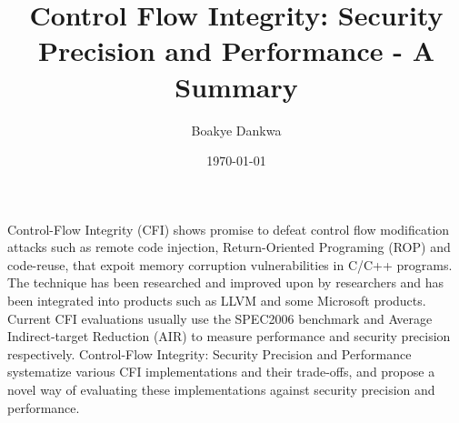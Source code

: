 \documentclass[dvips,12pt]{article}
\begin{document}

\title{Control Flow Integrity: Security Precision and Performance - A Summary}
\author{Boakye Dankwa}
\date{\today}



\maketitle


Control-Flow Integrity (CFI) shows promise to defeat control flow modification attacks such as remote code injection, Return-Oriented Programing (ROP) and code-reuse, that expoit memory corruption vulnerabilities in C/C++ programs. The technique has been researched and improved upon by researchers and has been integrated into products such as LLVM and some Microsoft products. Current CFI evaluations usually use the SPEC2006 benchmark and Average Indirect-target Reduction (AIR) to measure performance and security precision respectively. Control-Flow Integrity: Security Precision and Performance \cite{DBLP:journals/corr/BurowCBPNLF16} systematize various CFI implementations and their trade-offs, and propose a novel way of evaluating these implementations against security precision and performance.
\newline
\newline
\end{document}
